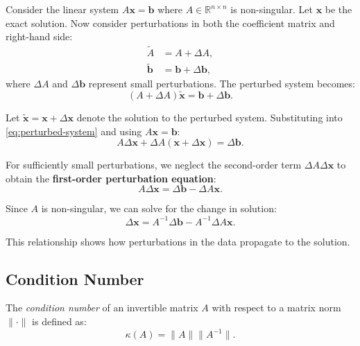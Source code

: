 \documentclass[../../main.tex]{subfiles}
\begin{document}
Consider the linear system $A\mathbf{x} = \mathbf{b}$ where $A \in \mathbb{R}^{n \times n}$ is non-singular. Let $\mathbf{x}$ be the exact solution. Now consider perturbations in both the coefficient matrix and right-hand side:
\begin{align}
    \tilde{A}          & = A + \Delta A,                   \\
    \tilde{\mathbf{b}} & = \mathbf{b} + \Delta \mathbf{b},
\end{align}
where $\Delta A$ and $\Delta \mathbf{b}$ represent small perturbations. The perturbed system becomes:
\begin{equation}
    (A + \Delta A)\tilde{\mathbf{x}} = \mathbf{b} + \Delta \mathbf{b}.
    \label{eq:perturbed-system}
\end{equation}

Let $\tilde{\mathbf{x}} = \mathbf{x} + \Delta \mathbf{x}$ denote the solution to the perturbed system. Substituting into \eqref{eq:perturbed-system} and using $A\mathbf{x} = \mathbf{b}$:
\begin{equation}
    A\Delta \mathbf{x} + \Delta A(\mathbf{x} + \Delta \mathbf{x}) = \Delta \mathbf{b}.
\end{equation}

For sufficiently small perturbations, we neglect the second-order term $\Delta A \Delta \mathbf{x}$ to obtain the \textbf{first-order perturbation equation}:
\begin{equation}
    A\Delta \mathbf{x} = \Delta \mathbf{b} - \Delta A \mathbf{x}.
    \label{eq:first-order-perturbation}
\end{equation}

Since $A$ is non-singular, we can solve for the change in solution:
\begin{equation}
    \Delta \mathbf{x} = A^{-1}\Delta \mathbf{b} - A^{-1}\Delta A \mathbf{x}.
    \label{eq:solution-perturbation}
\end{equation}

This relationship shows how perturbations in the data propagate to the solution.

\subsection{Condition Number}
The \emph{condition number} of an invertible matrix $A$ with respect to a matrix norm $\|\cdot\|$ is defined as:
\begin{equation}
    \kappa(A) = \|A\| \|A^{-1}\|.
    \label{eq:condition-number}
\end{equation}
\end{document}
